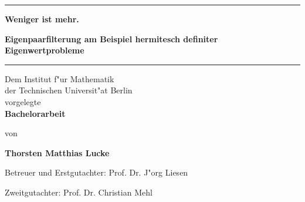 \begin{titlepage}
  \begin{center}
    \vspace*{1cm}

\hrule \vspace{0.5cm}
    \Huge
    \textbf{\glqq Weniger ist mehr.\grqq}

    \vspace{0.5cm}
    \LARGE
    \textbf{Eigenpaarfilterung am Beispiel hermitesch definiter Eigenwertprobleme}

\vspace{0.5cm} \hrule


    \vfill

    \small
    Dem Institut f"ur Mathematik\\
    der Technischen Universit"at Berlin\\
    vorgelegte\\

    \vspace{0.5cm}
    \LARGE
    \textbf{Bachelorarbeit}

    \vspace{1.5cm}

    \small
    von

    \vspace{0.5cm}
    \LARGE
    \textbf{Thorsten Matthias Lucke}

    \vfill

    \end{center}
    Betreuer und Erstgutachter: Prof. Dr. J"org Liesen

    Zweitgutachter: Prof. Dr. Christian Mehl

\end{titlepage}
